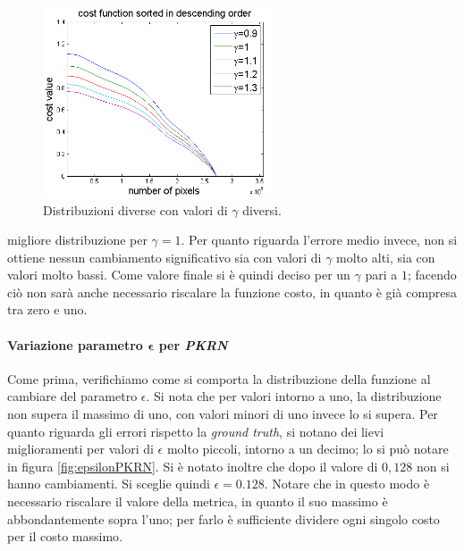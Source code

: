 \documentclass[12pt]{report}
\begin{document}
				\begin{figure}[H]
					\centering
					\includegraphics[width=0.6\textwidth]{./figures/gamma_LC.png}
					\caption{Distribuzioni diverse con valori di $\gamma$ diversi.}
					\label{fig:gammaLC}
				\end{figure} 
				
			 	\noindent migliore distribuzione per $\gamma=1$. Per quanto riguarda l'errore medio invece, non si ottiene nessun cambiamento significativo sia con valori di $\gamma$ molto alti, sia con valori molto bassi. Come valore finale si è quindi deciso per un $\gamma$ pari a $1$; facendo ciò non sarà anche necessario riscalare la funzione costo, in quanto è già compresa tra zero e uno.
		
		
			\paragraph{Variazione parametro $\bm{\epsilon}$ per \textit{PKRN}}
			\label{par:epsilon}
		
				Come prima, verifichiamo come si comporta la distribuzione della funzione al cambiare del parametro $\epsilon$. Si nota che per valori intorno a uno, la distribuzione non supera il massimo di uno, con valori minori di uno invece lo si supera. Per quanto riguarda gli errori rispetto la \textit{ground truth}, si notano dei lievi miglioramenti per valori di $\epsilon$ molto piccoli, intorno a un decimo; lo si può notare in figura \ref{fig:epsilonPKRN}. Si è notato inoltre che dopo il valore di $0,128$ non si hanno cambiamenti. Si sceglie quindi $\epsilon=0.128$. Notare che in questo modo è necessario riscalare il valore della metrica, in quanto il suo massimo è abbondantemente sopra l'uno; per farlo è sufficiente dividere ogni singolo costo per il costo massimo.
			
\end{document}
